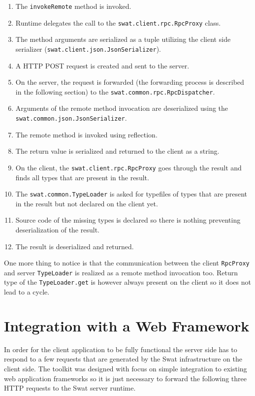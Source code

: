\documentclass[12pt,a4paper]{report}
\begin{document}
\begin{enumerate}
\item The \texttt{invokeRemote} method is invoked.
\item Runtime delegates the call to the \texttt{swat.client.rpc.RpcProxy} class.
\item The method arguments are serialized as a tuple utilizing the client side serializer (\texttt{swat.client.json.JsonSerializer}).
\item A HTTP POST request is created and sent to the server.
\item On the server, the request is forwarded (the forwarding process is described in the following section) to the \texttt{swat.common.rpc.RpcDispatcher}.
\item Arguments of the remote method invocation are deserialized using the \texttt{swat.common.json.JsonSerializer}.
\item The remote method is invoked using reflection.
\item The return value is serialized and returned to the client as a string.
\item On the client, the \texttt{swat.client.rpc.RpcProxy} goes through the result and finds all types that are present in the result.
\item The \texttt{swat.common.TypeLoader} is asked for typefiles of types that are present in the result but not declared on the client yet.
\item Source code of the missing types is declared so there is nothing preventing deserialization of the result.
\item The result is deserialized and returned.
\end{enumerate}

One more thing to notice is that the communication between the client \texttt{RpcProxy} and server \texttt{TypeLoader} is realized as a remote method invocation too. Return type of the \texttt{TypeLoader.get} is however always present on the client so it does not lead to a cycle.

\section{Integration with a Web Framework}

In order for the client application to be fully functional the server side has to respond to a few requests that are generated by the Swat infrastructure on the client side. The toolkit was designed with focus on simple integration to existing web application frameworks so it is just necessary to forward the following three HTTP requests to the Swat server runtime.
\end{document}
